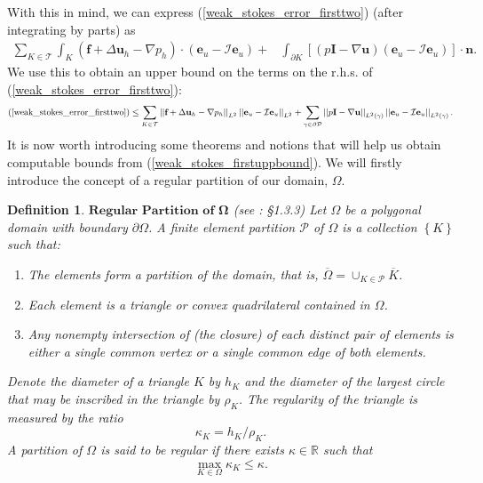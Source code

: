 \documentclass[12pt,a4paper]{article}
\newtheorem{definition}[theorem]{Definition}
\theoremstyle{definition}
\begin{document}
With this in mind, we can express (\ref{weak_stokes_error_firsttwo}) (after integrating by parts) as
\begin{equation}
\begin{aligned}
\sum_{K\in\mathcal{T}}\int_{K}\left(\textbf{f}+\Delta \textbf{u}_h-\nabla p_h\right)\cdot\left(\textbf{e}_u-\mathcal{I}\textbf{e}_u\right)+&\int_{\partial K}\left[\left(p\textbf{I}-\nabla\textbf{u}\right)\left(\textbf{e}_u-\mathcal{I}\textbf{e}_u\right)\right]\cdot\textbf{n}.
\end{aligned}
\end{equation}
We use this to obtain an upper bound on the terms on the r.h.s. of (\ref{weak_stokes_error_firsttwo}):
\begin{equation}\label{weak_stokes_firstuppbound}\small
\begin{aligned}
\text{(\ref{weak_stokes_error_firsttwo})}\leq\sum_{K\in\mathcal{T}}\left|\left|\textbf{f}+\Delta \textbf{u}_h-\nabla p_h\right|\right|_{L^2}\left|\left|\textbf{e}_u-\mathcal{I}\textbf{e}_u\right|\right|_{L^2} +\sum_{\gamma\in \partial \mathcal{P}}\left|\left|p\textbf{I}-\nabla\textbf{u}\right|\right|_{L^2\left(\gamma\right)}\left|\left|\textbf{e}_u-\mathcal{I}\textbf{e}_u\right|\right|_{L^2\left(\gamma\right)}.
\end{aligned}
\end{equation}
It is now worth introducing some theorems and notions that will help us obtain computable bounds from (\ref{weak_stokes_firstuppbound}).  We will firstly introduce the concept of a regular partition of our domain, $\Omega$.
\begin{definition}{$\textbf{Regular Partition of } \bm{\Omega}$ (see \cite{ainsworth2011posteriori}: \S1.3.3)}
	Let $\Omega$ be a polygonal domain with boundary $\partial \Omega$.  A finite element partition $\mathcal{P}$ of $\Omega$ is a collection $\left\{K\right\}$ such that:
	\begin{enumerate}
	\item The elements form a partition of the domain, that is, $\overline{\Omega}=\cup_{K\in\mathcal{P}}\overline{K}$.
	\item Each element is a triangle or convex quadrilateral contained in $\Omega$.
	\item Any nonempty intersection of (the closure) of each distinct pair of elements is either a single common vertex or a single common edge of both elements.
	\end{enumerate}
Denote the diameter of a triangle $K$ by $h_K$ and the diameter of the largest circle that may be inscribed in the triangle by $\rho_K$.  The regularity of the triangle is measured by the ratio
\begin{equation}
\kappa_K=h_K/\rho_K.\nonumber
\end{equation}
A partition of $\Omega$ is said to be regular if there exists $\kappa\in\mathbb{R}$ such that
\begin{equation}
\max_{K\in\Omega}\kappa_K\leq\kappa.\nonumber
\end{equation}
\end{definition}
\end{document}
